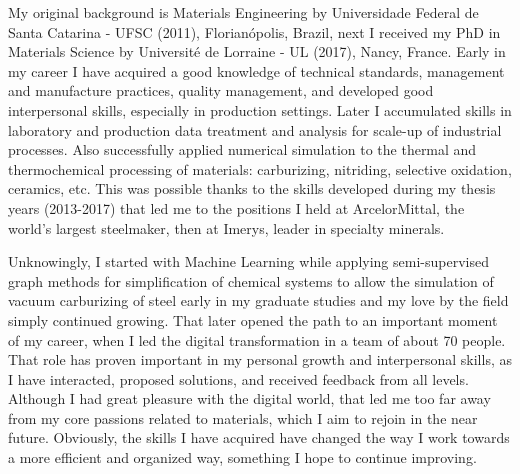 My original background is Materials Engineering by Universidade Federal de Santa Catarina - UFSC (2011), Florianópolis, Brazil, next I received my PhD in Materials Science by Université de Lorraine - UL (2017), Nancy, France. Early in my career I have acquired a good knowledge of technical standards, management and manufacture practices, quality management, and developed good interpersonal skills, especially in production settings. Later I accumulated skills in laboratory and production data treatment and analysis for scale-up of industrial processes. Also successfully applied numerical simulation to the thermal and thermochemical processing of materials: carburizing, nitriding, selective oxidation, ceramics, etc. This was possible thanks to the skills developed during my thesis years (2013-2017) that led me to the positions I held at ArcelorMittal, the world's largest steelmaker, then at Imerys, leader in specialty minerals.
%
\par\vskip6pt%
%
Unknowingly, I started with Machine Learning while applying semi-supervised graph methods for simplification of chemical systems to allow the simulation of vacuum carburizing of steel early in my graduate studies and my love by the field simply continued growing. That later opened the path to an important moment of my career, when I led the digital transformation in a team of about 70 people. That role has proven important in my personal growth and interpersonal skills, as I have interacted, proposed solutions, and received feedback from all levels. Although I had great pleasure with the digital world, that led me too far away from my core passions related to materials, which I aim to rejoin in the near future. Obviously, the skills I have acquired have changed the way I work towards a more efficient and organized way, something I hope to continue improving.

\endinput%